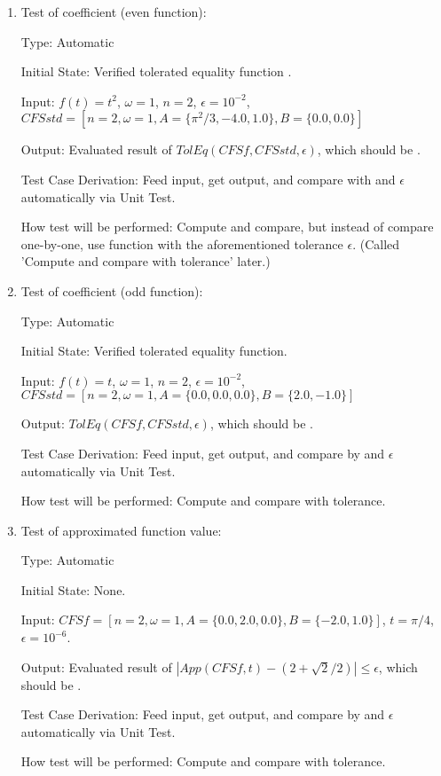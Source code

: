 \documentclass[12pt, titlepage]{article}
\begin{document}
\begin{enumerate}
	\item{Test of coefficient (even function):\\}
	
	Type: Automatic
	
	Initial State: Verified tolerated equality function .
	
	Input: $f(t)=t^2$, $\omega=1$, $n=2$, $\epsilon=10^{-2}$,
        $\mathit{CFSstd}=[n=2,\omega=1, A=\{\pi^2/3, -4.0, 1.0\}, B=\{0.0,
        0.0\}]$
	
	Output: Evaluated result of
        $\mathit{TolEq}(\mathit{CFSf}, \mathit{CFSstd}, \epsilon)$, which should
        be . 
	
	Test Case Derivation: Feed input, get output, and compare with  and $\epsilon$ automatically via Unit Test.
	
	How test will be performed: Compute and compare, but instead of compare one-by-one, use  function with the aforementioned tolerance $\epsilon$. (Called 'Compute and compare with tolerance' later.)
	
	\item{Test of coefficient (odd function):\\}
	
	Type: Automatic	
	
	Initial State: Verified tolerated equality function.
	
	Input: $f(t)=t$, $\omega=1$, $n=2$, $\epsilon=10^{-2}$,
        $\mathit{CFSstd}=[n=2,\omega=1, A=\{0.0, 0.0, 0.0\}, B=\{2.0, -1.0\}]$
	
	Output: $\mathit{TolEq}(\mathit{CFSf}, \mathit{CFSstd}, \epsilon)$,
        which should be .
	
	Test Case Derivation: Feed input, get output, and compare by  and $\epsilon$ automatically via Unit Test.
	
	
	How test will be performed: Compute and compare with tolerance.
	
	\item{Test of approximated function value: \\}
	
	Type: Automatic
	
	Initial State: None.
	
	Input: $\mathit{CFSf}=[n=2,\omega=1, A=\{0.0, 2.0, 0.0\}, B=\{-2.0,
        1.0\}]$, $t=\pi/4$, $\epsilon=10^{-6}$.
	
	Output: Evaluated result of
        $|\mathit{App}(\mathit{CFSf}, t)-(2+\sqrt{2}/2)|\leq\epsilon$, which
        should be .
	
	Test Case Derivation: Feed input, get output, and compare by  and $\epsilon$ automatically via Unit Test.
	
	
	How test will be performed: Compute and compare with tolerance.
	
\end{enumerate}
\end{document}
